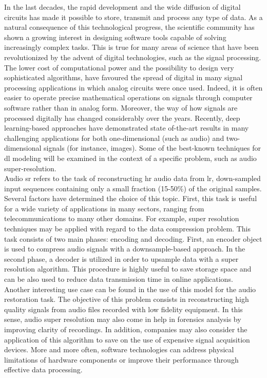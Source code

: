In the last decades, the rapid development and the wide diffusion of digital circuits has made it possible to store, transmit and process any type of data. As a natural consequence of this technological progress, the scientific community has shown a growing interest in designing software tools capable of solving increasingly complex tasks. This is true for many areas of science that have been revolutionized by the advent of digital technologies, such as the signal processing. The lower cost of computational power and the possibility to design very sophisticated algorithms, have favoured the spread of digital in many signal processing applications in which analog circuits were once used. Indeed, it is often easier to operate precise mathematical operations on signals through computer software rather than in analog form. Moreover, the way of how signals are processed digitally has changed considerably over the years. Recently, deep learning-based approaches have demonstrated state of-the-art results in many challenging applications for both one-dimensional (such as audio) and two-dimensional signals (for instance, images). Some of the best-known techniques for \gls{dl} modeling will be examined in the context of a specific problem, such as audio super-resolution. \\
Audio \gls{sr} refers to the task of reconstructing \gls{hr} audio data from \gls{lr}, down-sampled input sequences containing only a small fraction (15-50\%) of the original samples. Several factors have determined the choice of this topic. First, this task is useful for a wide variety of applications in many sectors, ranging from telecommunications to many other domains. For example, super resolution techniques may be applied with regard to the data compression problem. This task consists of two main phases: encoding and decoding. First, an encoder object is used to compress audio signals with a downsample-based approach. In the second phase, a decoder is utilized in order to upsample data with a super resolution algorithm. This procedure is highly useful to save storage space and can be also used to reduce data transmission time in online applications. \\
Another interesting use case can be found in the use of this model for the audio restoration task. The objective of this problem consists in reconstructing high quality signals from audio files recorded with low fidelity equipment. In this sense, audio super resolution may also come in help in forensics analysis by improving clarity of recordings. In addition, companies may also consider the application of this algorithm to save on the use of expensive signal acquisition devices. More and more often, software technologies can address physical limitations of hardware components or improve their performance through effective data processing.\\
